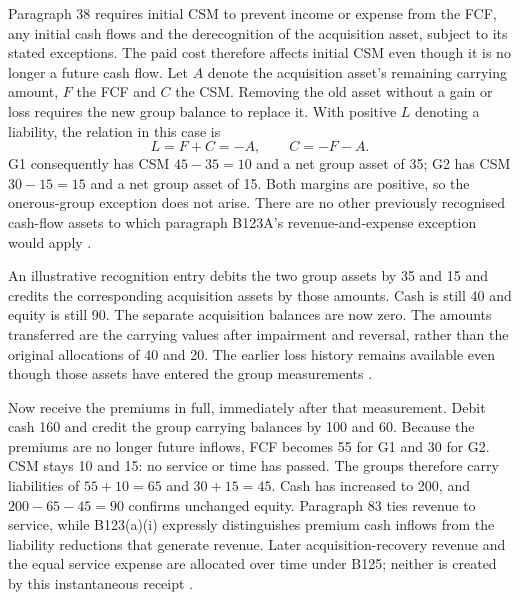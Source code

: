 Paragraph 38 requires initial CSM to prevent income or expense from the FCF,
any initial cash flows and the derecognition of the acquisition asset, subject
to its stated exceptions. The paid cost therefore affects initial CSM even
though it is no longer a future cash flow. Let $A$ denote the acquisition
asset's remaining carrying amount, $F$ the FCF and $C$ the CSM. Removing the
old asset without a gain or loss requires the new group balance to replace it.
With positive $L$ denoting a liability, the relation in this case is
\[
 L=F+C=-A,\qquad C=-F-A.
\]
G1 consequently has CSM $45-35=10$ and a net group asset of 35; G2 has CSM
$30-15=15$ and a net group asset of 15. Both margins are positive, so the
onerous-group exception does not arise. There are no other previously
recognised cash-flow assets to which paragraph B123A's revenue-and-expense
exception would apply \citep[paragraphs 28C, 32, 38, 47 and B123A]{aasb17}.

An illustrative recognition entry debits the two group assets by 35 and 15
and credits the corresponding acquisition assets by those amounts. Cash is
still 40 and equity is still 90. The separate acquisition balances are now
zero. The amounts transferred are the carrying values after impairment and
reversal, rather than the original allocations of 40 and 20. The earlier
loss history remains available even though those assets have entered the
group measurements \citep[paragraphs 28C--28D and B35C]{aasb17}.

Now receive the premiums in full, immediately after that measurement. Debit
cash 160 and credit the group carrying balances by 100 and 60. Because the
premiums are no longer future inflows, FCF becomes 55 for G1 and 30 for G2.
CSM stays 10 and 15: no service or time has passed. The groups therefore carry
liabilities of $55+10=65$ and $30+15=45$. Cash has increased to 200, and
$200-65-45=90$ confirms unchanged equity. Paragraph 83 ties revenue to
service, while B123(a)(i) expressly distinguishes premium cash inflows from
the liability reductions that generate revenue. Later acquisition-recovery
revenue and the equal service expense are allocated over time under B125;
neither is created by this instantaneous receipt
\citep[paragraphs 40--41, 83--85 and B123--B125]{aasb17}.


